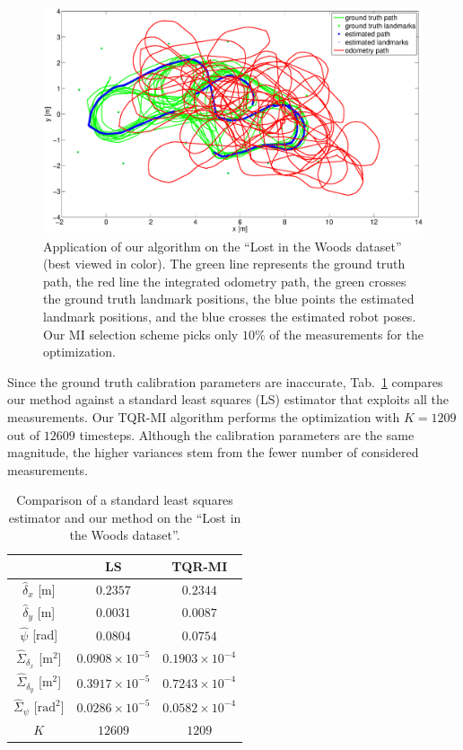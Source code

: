 \begin{figure}[t]
\centering
\includegraphics[width=\columnwidth]{fig/dataset2-path-result.eps}
\caption{Application of our algorithm on the ``Lost in the Woods dataset''
  (best viewed in color). The
  green line represents the ground truth path, the red line the integrated
  odometry path, the green crosses the ground truth landmark positions, the blue
  points the estimated landmark positions, and the blue crosses the estimated
  robot poses. Our MI selection scheme picks only $10\%$ of the measurements
  for the optimization.}
\label{fig:dataset2-path-result}
\end{figure}

Since the ground truth calibration parameters are inaccurate,
Tab.~\ref{tab:dataset2-comp} compares our method against a standard
least squares (LS) estimator that exploits all the measurements. Our TQR-MI
algorithm performs the optimization with $K=1209$ out of $12609$ timesteps.
Although the calibration parameters are the same magnitude, the higher variances
stem from the fewer number of considered measurements.

\begin{table}[!t]
\renewcommand{\arraystretch}{1.3}
\caption{Comparison of a standard least squares estimator and our
  method on the ``Lost in the Woods dataset''.}
\label{tab:dataset2-comp}
\centering
\begin{tabular}{c||c||c}
\hline
& \bfseries LS & \bfseries TQR-MI\\
\hline\hline
$\hat{\delta}_x$ [m] & $0.2357$ & $0.2344$\\
\hline
$\hat{\delta}_y$ [m]& $0.0031$ & $0.0087$\\
\hline
$\hat{\psi}$ [rad] & $0.0804$ & $0.0754$\\
\hline
$\hat{\Sigma}_{\delta_x}$ [$\text{m}^2$] & $0.0908\times 10^{-5}$ &
  $0.1903\times 10^{-4}$\\
\hline
$\hat{\Sigma}_{\delta_y}$ [$\text{m}^2$] & $0.3917\times 10^{-5}$ &
  $0.7243\times 10^{-4}$\\
\hline
$\hat{\Sigma}_{\psi}$ [$\text{rad}^2$] & $0.0286\times 10^{-5}$ &
  $0.0582\times 10^{-4}$\\
\hline
$K$ & $12609$ & $1209$\\
\hline
\end{tabular}
\end{table}
